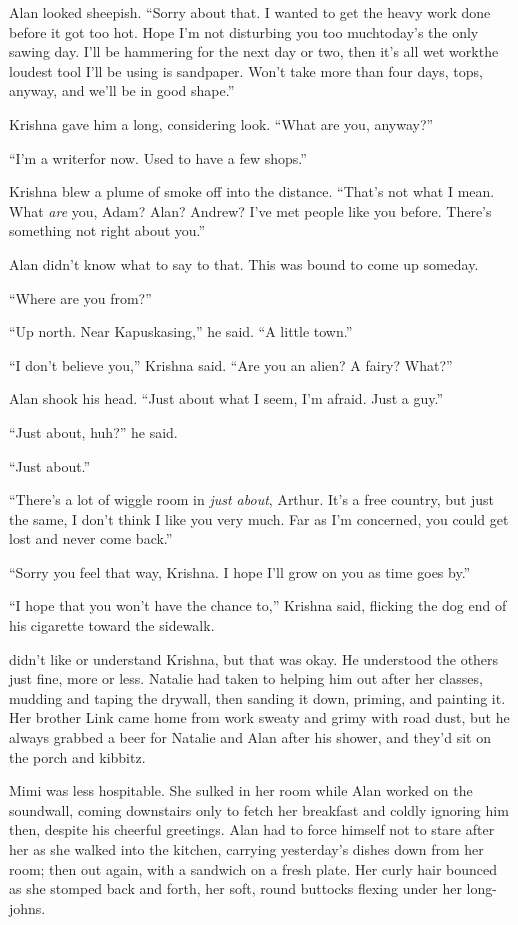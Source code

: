 Alan looked sheepish.  ``Sorry about that.  I wanted to get the heavy
work done before it got too hot.  Hope I'm not disturbing you too
much\dash{}today's the only sawing day.  I'll be hammering for the next
day or two, then it's all wet work\dash{}the loudest tool I'll be using is
sandpaper.  Won't take more than four days, tops, anyway, and we'll be
in good shape.''

Krishna gave him a long, considering look.  ``What are you, anyway?''

``I'm a writer\dash{}for now.  Used to have a few shops.''

Krishna blew a plume of smoke off into the distance.  ``That's not
what I mean.  What \textit{are} you, Adam?  Alan?  Andrew?  I've met
people like you before.  There's something not right about you.''

Alan didn't know what to say to that.  This was bound to come up
someday.

``Where are you from?''

``Up north.  Near Kapuskasing,'' he said.  ``A little town.''

``I don't believe you,'' Krishna said.  ``Are you an alien?  A fairy? 
What?''

Alan shook his head.  ``Just about what I seem, I'm afraid.  Just a
guy.''

``Just about, huh?'' he said.

``Just about.''

``There's a lot of wiggle room in \textit{just about}, Arthur.  It's a
free country, but just the same, I don't think I like you very much. 
Far as I'm concerned, you could get lost and never come back.''

``Sorry you feel that way, Krishna.  I hope I'll grow on you as time
goes by.''

``I hope that you won't have the chance to,'' Krishna said, flicking
the dog end of his cigarette toward the sidewalk.

 didn't like or understand Krishna, but that was okay.  He
understood the others just fine, more or less.  Natalie had taken to
helping him out after her classes, mudding and taping the drywall,
then sanding it down, priming, and painting it.  Her brother Link came
home from work sweaty and grimy with road dust, but he always grabbed
a beer for Natalie and Alan after his shower, and they'd sit on the
porch and kibbitz.

Mimi was less hospitable.  She sulked in her room while Alan worked on
the soundwall, coming downstairs only to fetch her breakfast and
coldly ignoring him then, despite his cheerful greetings.  Alan had to
force himself not to stare after her as she walked into the kitchen,
carrying yesterday's dishes down from her room; then out again, with a
sandwich on a fresh plate.  Her curly hair bounced as she stomped back
and forth, her soft, round buttocks flexing under her long-johns.

